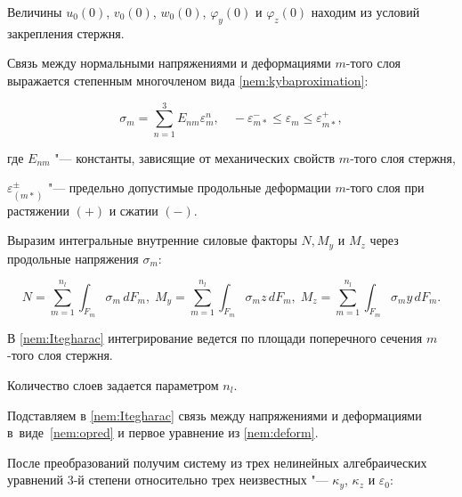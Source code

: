 Величины $u_0(0)$, $v_0 (0)$, $w_0 (0)$, $\varphi_y(0)$ и $\varphi_z(0)$ находим из условий закрепления стержня.



Связь между нормальными напряжениями и деформациями $m$-того слоя выражается степенным многочленом вида \eqref{nem:kybaproximation}:

\begin{equation}

\label{nem:opred}

\sigma_m=\sum_{n=1}^3 E_{nm} \varepsilon^n_m, \quad 

-\varepsilon^-_{m*}\le\varepsilon_m\le\varepsilon^+_{m*},

\end{equation}

где $E_{nm}$ "---  константы, зависящие от механических свойств $m$-того слоя стержня, 

$\varepsilon_{(m*)}^\pm$ "---  предельно допустимые продольные деформации $m$-того слоя при растяжении $(+)$ и сжатии $(-)$.



\smallskip




Выразим интегральные внутренние силовые факторы $N, M_y$  и $M_z$ через продольные напряжения $\sigma_m$:

\begin{equation}\label{nem:Itegharac}

N=\sum_{m=1}^{n_l}\int _{F_m}\sigma_m\,dF_m, \;

M_y=\sum_{m=1}^{n_l}\int _{F_m}\sigma_m z\,dF_m, \;

M_z=\sum_{m=1}^{n_l}\int _{F_m}\sigma_m  y\, dF_m.

\end{equation}

В \eqref{nem:Itegharac} интегрирование ведется по площади поперечного сечения $m$-того слоя стержня.

Количество слоев задается параметром $n_l$.



Подставляем в \eqref{nem:Itegharac} связь между напряжениями и деформациями в~виде~\eqref{nem:opred} и первое уравнение из \eqref{nem:deform}.

После преобразований получим систему из трех нелинейных алгебраических уравнений 3-й степени относительно трех неизвестных "---  $\kappa_y$, $\kappa_z$ и $\varepsilon_0$:

